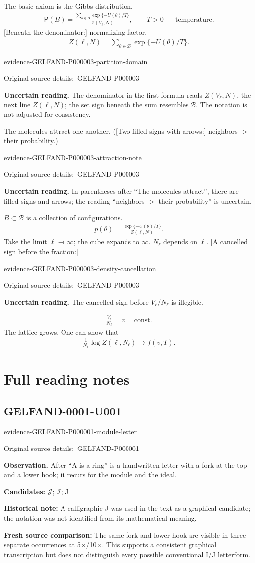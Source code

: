 \documentclass[11pt]{article}
\newcommand{\EvidenceBlock}[4]{%
 \par\smallskip\noindent\begin{minipage}{\linewidth}
 \begin{minipage}[t]{.47\linewidth}\vspace{0pt}\centering
 \csname evidence-#1-#2\endcsname\par
 {\scriptsize\SourceCropCaption\ #1}\par
 \end{minipage}\hfill
 \begin{minipage}[t]{.49\linewidth}\vspace{0pt}\raggedright
 {\small\color{orange!65!black}\textbf{#4} #3}\par
 \end{minipage}
 \end{minipage}\par\smallskip}
\newcommand{\Unclear}[3]{\EvidenceBlock{#1}{#2}{#3}{\ReadingCaption}}
\newcommand{\SourceCropCaption}{Original source details:}\newcommand{\ReadingCaption}{Uncertain reading.}\newcommand{\IncompleteCaption}{Undeciphered passage.}\newcommand{\DiagramCaption}{Diagram and typed description.}
\begin{document}
The basic axiom is the Gibbs distribution.
\begin{gather*}
 \mathsf{P}(B)=
 \frac{\displaystyle\sum_{\theta\in B}\exp\{-U(\theta)/T\}}
 {Z(V_\ell,N)},\qquad T>0\text{ --- temperature.}
\end{gather*}
[Beneath the denominator:] normalizing factor.
\begin{gather*}
 Z(\ell,N)=\sum_{\theta\in\mathcal{B}}\exp\{-U(\theta)/T\}.
\end{gather*}
\Unclear{GELFAND-P000003}{partition-domain}{The denominator in the first formula reads $Z(V_\ell,N)$, the next line $Z(\ell,N)$; the set sign beneath the sum resembles $\mathcal{B}$. The notation is not adjusted for consistency.}

The molecules attract one another.
([Two filled signs with arrows:] neighbors $>$ their probability.)
\Unclear{GELFAND-P000003}{attraction-note}{In parentheses after ``The molecules attract'', there are filled signs and arrows; the reading ``neighbors $>$ their probability'' is uncertain.}
$B\subset\mathcal{B}$ is a collection of configurations.
\begin{gather*}
 p(\theta)=\frac{\exp\{-U(\theta)/T\}}{Z(\ell,N)}.
\end{gather*}
Take the limit $\ell\to\infty$; the cube expands to $\infty$.
$N_\ell$ depends on $\ell$.
[A cancelled sign before the fraction:]
\Unclear{GELFAND-P000003}{density-cancellation}{The cancelled sign before $V_\ell/N_\ell$ is illegible.}
\begin{gather*}
 \frac{V_\ell}{N_\ell}=v=\mathrm{const}.
\end{gather*}
The lattice grows.
One can show that
\begin{gather*}
 \frac1{N_\ell}\log Z(\ell,N_\ell)\longrightarrow f(v,T).
\end{gather*}
\clearpage\section*{Full reading notes}
\subsection*{GELFAND-0001-U001}
\EvidenceBlock{GELFAND-P000001}{module-letter}{After “A is a ring” is a handwritten letter with a fork at the top and a lower hook; it recurs for the module and the ideal.}{Observation.}
\par\smallskip\noindent\textbf{Candidates: } \(\mathcal{J}\); \(\mathcal{I}\); J\par
\par\smallskip\noindent\textbf{Historical note: } A calligraphic J was used in the text as a graphical candidate; the notation was not identified from its mathematical meaning.\par
\par\smallskip\noindent\textbf{Fresh source comparison: } The same fork and lower hook are visible in three separate occurrences at 5×/10×. This supports a consistent graphical transcription but does not distinguish every possible conventional I/J letterform.\par
\end{document}
